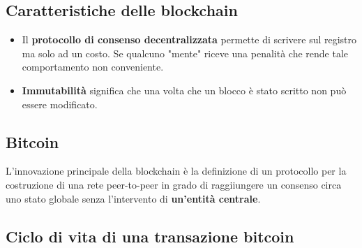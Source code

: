 \documentclass[a4paper]{article}
\begin{document}
\subsection{Caratteristiche delle blockchain}
\begin{itemize}
    \item Il \textbf{protocollo di consenso decentralizzata} permette di scrivere sul registro ma solo ad un costo. Se qualcuno "mente" riceve una penalità 
    che rende tale comportamento non conveniente. 
    \item \textbf{Immutabilità} significa che una volta che un blocco è stato scritto non può essere modificato.
\end{itemize}

\subsection{Bitcoin}

L'innovazione principale della blockchain è la definizione di un protocollo per la costruzione di una rete peer-to-peer in grado di raggiiungere un consenso
circa uno stato globale senza l'intervento di \textbf{un'entità centrale}.

\subsection{Ciclo di vita di una transazione bitcoin}
\end{document}
